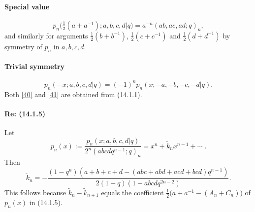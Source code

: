 \documentclass[twoside,11pt]{article}
\newcommand\thalf{\tfrac12}
\newcommand\wt{\widetilde}
\begin{document}
\paragraph{Special value}
\begin{equation}
p_n\big(\thalf(a+a^{-1});a,b,c,d |  q\big)=a^{-n} (ab,ac,ad;q)_n ,
\label{40}
\end{equation}
and similarly for arguments $\thalf(b+b^{-1})$, $\thalf(c+c^{-1})$ and
$\thalf(d+d^{-1})$ by symmetry of $p_n$ in $a,b,c,d$.
%
\paragraph{Trivial symmetry}
\begin{equation}
p_n(-x;a,b,c,d |  q)=(-1)^n p_n(x;-a,-b,-c,-d |  q).
\label{41}
\end{equation}
Both \eqref{40} and \eqref{41} are obtained from (14.1.1).
%
\paragraph{Re: (14.1.5)}
Let
\begin{equation}
p_n(x):=\frac{p_n(x;a,b,c,d |  q)}{2^n(abcdq^{n-1};q)_n}=x^n+\wt k_n x^{n-1}
+\cdots\;.
\label{18}
\end{equation}
Then
\begin{equation}
\wt k_n=-\frac{(1-q^n)(a+b+c+d-(abc+abd+acd+bcd)q^{n-1})}
{2(1-q)(1-abcdq^{2n-2})} .
\label{19}
\end{equation}
This follows because $\tilde k_n-\tilde k_{n+1}$ equals the coefficient
$\thalf\bigl(a+a^{-1}-(A_n+C_n)\bigr)$ of $p_n(x)$ in (14.1.5).
%
\end{document}

